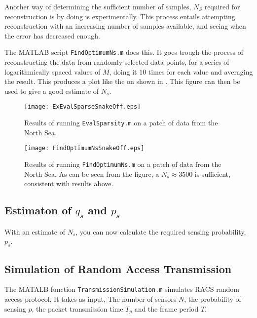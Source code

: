 \documentclass[Main]{subfiles}
\begin{document}
		Another way of determining the sufficient number of samples, $N_S$ required for reconstruction is by doing is experimentally.
		This process entails attempting reconstruction with an increasing number of samples available, and seeing when the error has decreased enough.

		The MATLAB script \texttt{FindOptimumNs.m} does this.
		It goes trough the process of reconstructing the data from randomly selected data points, for a series of logarithmically spaced values of $M$, doing it 10 times for each value and averaging the result.
		This produces a plot like the on shown in .
		This figure can then be used to give a good estimate of $N_s$.

		\begin{figure}[H]
			\centering 
			\texttt{[image: ExEvalSparseSnakeOff.eps]}
			\caption{
				Results of running \texttt{EvalSparsity.m} on a patch of data from the North Sea.}
			\label{fig:ExEvalSparseSnakeOff}
		\end{figure}

		\begin{figure}[H]
			\centering 
			\texttt{[image: FindOptimumNsSnakeOff.eps]}
			\caption{
				Results of running \texttt{FindOptimumNs.m} on a patch of data from the North Sea. As can be seen from the figure, a $N_s \approx 3500$ is sufficient, consistent with results above.}
			\label{fig:FindOptimumNsSnakeOff}
		\end{figure}



	

	\subsection{Estimaton of $q_s$ and $p_s$} %
	\label{sub:estimaton_of_q_s_and_p_s_}

		With an estimate of $N_s$, you can now calculate the required sensing probability, $p_s$.
	

	\subsection{Simulation of Random Access Transmission} %
	\label{sub:simulation_of_random_access_transmission}

		The MATALB function \texttt{TransmissionSimulation.m} simulates RACS random access protocol.
		It takes as input, The number of sensors $N$, the probability of sensing $p$, the packet transmission time $T_p$ and the frame period $T$.
\end{document}
